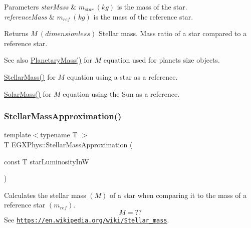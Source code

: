 \begin{DoxyParams}{Parameters}
{\em star\+Mass} & $m_{star}\ (kg)$ is the mass of the star. \\
\hline
{\em reference\+Mass} & $m_{ref}\ (kg)$ is the mass of the reference star. \\
\hline
\end{DoxyParams}
\begin{DoxyReturn}{Returns}
$M\ (dimensionless)$ Stellar mass. Mass ratio of a star compared to a reference star. 
\end{DoxyReturn}
\begin{DoxySeeAlso}{See also}
\mbox{\hyperlink{group___e_g_x_phys-_planetary_mass_ga225bcf56fb37468f6d4d46493d403503}{Planetary\+Mass()}} for $M$ equation used for planets size objects. 

\mbox{\hyperlink{group___e_g_x_phys-_stellar_mass_ga6c1b42cfd62e3174709ddbf15a87b460}{Stellar\+Mass()}} for $M$ equation using a star as a reference. 

\mbox{\hyperlink{group___e_g_x_phys-_stellar_mass_ga4988f903a27ec9cfa63f72b003d876fd}{Solar\+Mass()}} for $M$ equation using the Sun as a reference. 
\end{DoxySeeAlso}
\mbox{\label{group___e_g_x_phys-_stellar_mass_ga5eeb9652876859bff3afdd352dd7925e}} 
\subsubsection{\texorpdfstring{Stellar\+Mass\+Approximation()}{StellarMassApproximation()}}
{\footnotesize\ttfamily template$<$typename T $>$ \\
T E\+G\+X\+Phys\+::\+Stellar\+Mass\+Approximation (\begin{DoxyParamCaption}\item[{const T}]{star\+Luminosity\+InW }\end{DoxyParamCaption})}



Calculates the stellar mass $(M)$ of a star when comparing it to the mass of a reference star $(m_{ref})$. \[M=??\] See \href{https://en.wikipedia.org/wiki/Stellar_mass}{\tt https\+://en.\+wikipedia.\+org/wiki/\+Stellar\+\_\+mass}. 


